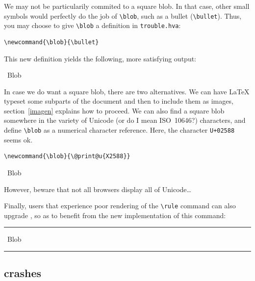 We may not be particularily commited to a square blob.
In that case, other small symbols would perfectly do the job
of \verb+\blob+, such as a bullet (\verb+\bullet+).
Thus, you may choose to give \verb+\blob+ a definition in
\verb+trouble.hva+:
\begin{verbatim}
\newcommand{\blob}{\bullet}
\end{verbatim}
This new definition yields the following, more satisfying output:
\begin{htmlout}\newcommand{\blob}{\bullet}%
\begin{htmlonly}%
\blob\ Blob \blob
\end{htmlonly}
\begin{latexonly}\vspace*{.5ex}
%
\end{latexonly}%
\end{htmlout}

\label{square:blob}
%
In case we do want a square blob, there are two alternatives.
We can have \LaTeX{} typeset some subparts of
the document and then to include them as images, section~\ref{imagen}
explains how to proceed.
We can also find a square blob somewhere in the variety of Unicode
(or do I mean ISO~10646?) characters,
and define \verb+\blob+ as a numerical
character reference. Here, the character \texttt{U+02588}
seems ok.
\begin{verbatim}
\newcommand{\blob}{\@print@u{X2588}}
\end{verbatim}
\begin{htmlout}%
\begin{htmlonly}\newcommand{\blob}{}%
\blob\ Blob \blob
\end{htmlonly}
\begin{latexonly}\vspace*{.5ex}
%
\end{latexonly}%
\end{htmlout}
However, beware that not all browsers display all of Unicode\ldots

Finally, users that experience poor rendering of the \verb+\rule+ command can also upgrade \hevea, so as to benefit from the new implementation of this
command:
\begin{center}
\newcommand{\blob}{\rule[.2ex]{1ex}{1ex}}
\blob\ Blob \blob
\end{center}


\subsection{\hevea{} crashes}

